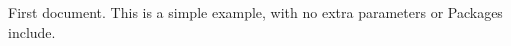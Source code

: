 \documentclass{article}
\begin{document}
First document. This is a simple example, with no extra parameters or Packages include.
\end{document}
